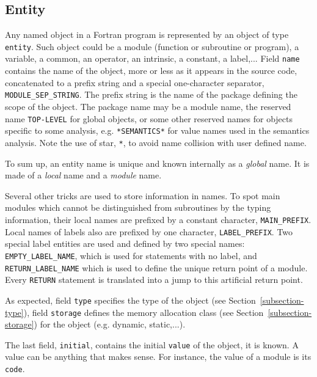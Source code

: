 \subsection{Entity}
\label{subsection-entity}


Any named object in a Fortran program is represented by an object of
type {\tt entity}. Such object could be a module (function or subroutine
or program), a variable, a common, an operator, an intrinsic, a
constant, a label,... Field {\tt name} contains the name of the object,
more or less as it appears in the source code, concatenated to a prefix
string and a special one-character separator, {\tt
MODULE_SEP_STRING}. The prefix string is the name of the package
defining the scope of the object. The package name may be a module name,
the reserved name {\tt TOP-LEVEL} for global objects, or some other
reserved names for objects specific to some analysis,
e.g. \verb+*SEMANTICS*+ for value names used in the semantics
analysis. Note the use of star, \verb+*+, to avoid name collision with
user defined name.

To sum up, an entity name is unique and known internally as a {\em
global} name. It is made of a {\em local} name and a {\em module} name.

Several other tricks are used to store information in names. To spot
main modules which cannot be distinguished from subroutines by the
typing information, their local names are prefixed by a constant
character, {\tt MAIN\_PREFIX}. Local names of labels also
are prefixed by one character, {\tt LABEL_PREFIX}. Two special label
entities are used and defined by two special names: {\tt
EMPTY\_LABEL\_NAME}, which is used for statements with no label, and
{\tt RETURN_LABEL_NAME} which is used to define the unique return point
of a module. Every {\tt RETURN} statement is translated into a jump to
this artificial return point.

As expected, field {\tt type} specifies the type of the object (see
Section~\ref{subsection-type}), field {\tt storage} defines the memory
allocation class (see Section~\ref{subsection-storage}) for the object
(e.g. dynamic, static,...).

The last field, {\tt initial}, contains the initial {\tt value} of the
object, it is known. A value can be anything that makes sense. For
instance, the value of a module is its {\tt code}.

